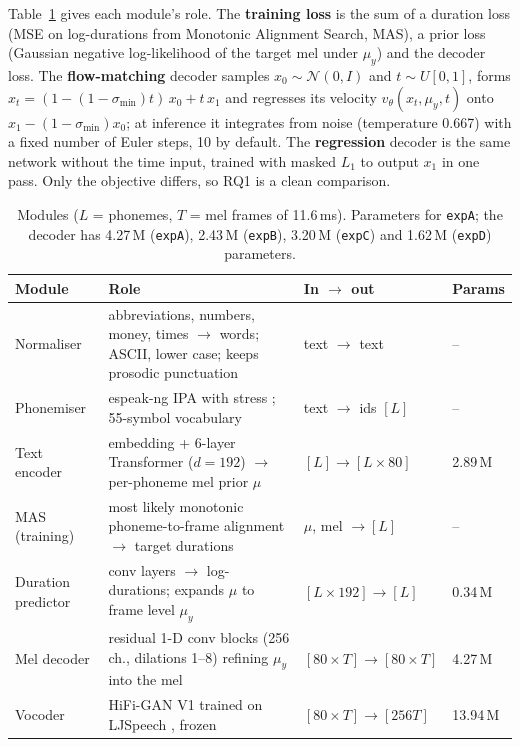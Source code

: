 \documentclass[11pt,a4paper]{article}
\newcommand{\expA}{\texttt{expA}}
\newcommand{\expB}{\texttt{expB}}
\newcommand{\expC}{\texttt{expC}}
\newcommand{\expD}{\texttt{expD}}
\begin{document}
\noindent Table~\ref{tab:modules} gives each module's role. The \textbf{training loss} is the sum of a duration loss (MSE on log-durations from Monotonic Alignment Search, MAS), a prior loss (Gaussian negative log-likelihood of the target mel under $\mu_y$) and the decoder loss. The \textbf{flow-matching} decoder \citep{lipman2023flowmatching,mehta2024matcha} samples $x_0\!\sim\!\mathcal N(0,I)$ and $t\!\sim\!U[0,1]$, forms $x_t=(1-(1-\sigma_{\min})t)\,x_0+t\,x_1$ and regresses its velocity $v_\theta(x_t,\mu_y,t)$ onto $x_1-(1-\sigma_{\min})x_0$; at inference it integrates from noise (temperature 0.667) with a fixed number of Euler steps, 10 by default. The \textbf{regression} decoder is the same network without the time input, trained with masked $L_1$ to output $x_1$ in one pass. Only the objective differs, so RQ1 is a clean comparison.

\begin{table}[H]
\centering\small
\caption{Modules ($L$ = phonemes, $T$ = mel frames of 11.6\,ms). Parameters for \expA; the decoder has 4.27\,M (\expA), 2.43\,M (\expB), 3.20\,M (\expC) and 1.62\,M (\expD) parameters.}
\label{tab:modules}
\begin{tabularx}{\linewidth}{@{}l>{\raggedright\arraybackslash}Xll@{}}
\toprule
Module & Role & In $\rightarrow$ out & Params \\ \midrule
Normaliser & abbreviations, numbers, money, times $\rightarrow$ words; ASCII, lower case; keeps prosodic punctuation & text $\rightarrow$ text & -- \\
Phonemiser & espeak-ng IPA with stress \citep{bernard2021phonemizer}; 55-symbol vocabulary & text $\rightarrow$ ids $[L]$ & -- \\
Text encoder & embedding + 6-layer Transformer \citep{vaswani2017attention} ($d{=}192$) $\rightarrow$ per-phoneme mel prior $\mu$ & $[L] \rightarrow [L{\times}80]$ & 2.89\,M \\
MAS (training) & most likely monotonic phoneme-to-frame alignment $\rightarrow$ target durations \citep{kim2020glowtts} & $\mu$, mel $\rightarrow [L]$ & -- \\
Duration predictor & 3 conv layers $\rightarrow$ log-durations; expands $\mu$ to frame level $\mu_y$ & $[L{\times}192] \rightarrow [L]$ & 0.34\,M \\
Mel decoder & residual 1-D conv blocks (256 ch., dilations 1--8) refining $\mu_y$ into the mel & $[80{\times}T] \rightarrow [80{\times}T]$ & 4.27\,M \\
Vocoder & HiFi-GAN V1 trained on LJSpeech \citep{kong2020hifigan}, frozen & $[80{\times}T] \rightarrow [256T]$ & 13.94\,M \\ \bottomrule
\end{tabularx}
\end{table}
\end{document}
